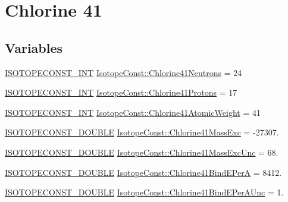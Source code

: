 \hypertarget{group___isotope_const-_chlorine-_cl41}{}\section{Chlorine 41}
\label{group___isotope_const-_chlorine-_cl41}
\subsection*{Variables}
\begin{DoxyCompactItemize}
\item 
\mbox{\hyperlink{group___isotope_const-_macros_ga5f18360b3e99483a35c32d789e62621c}{I\+S\+O\+T\+O\+P\+E\+C\+O\+N\+S\+T\+\_\+\+I\+NT}} \mbox{\hyperlink{group___isotope_const-_chlorine-_cl41_ga86fe7f65ce8d27b42a7aa416a1ee713c}{Isotope\+Const\+::\+Chlorine41\+Neutrons}} = 24
\item 
\mbox{\hyperlink{group___isotope_const-_macros_ga5f18360b3e99483a35c32d789e62621c}{I\+S\+O\+T\+O\+P\+E\+C\+O\+N\+S\+T\+\_\+\+I\+NT}} \mbox{\hyperlink{group___isotope_const-_chlorine-_cl41_ga52c18c4fc63b2d8b0b0d19fc27fe2243}{Isotope\+Const\+::\+Chlorine41\+Protons}} = 17
\item 
\mbox{\hyperlink{group___isotope_const-_macros_ga5f18360b3e99483a35c32d789e62621c}{I\+S\+O\+T\+O\+P\+E\+C\+O\+N\+S\+T\+\_\+\+I\+NT}} \mbox{\hyperlink{group___isotope_const-_chlorine-_cl41_gaf37e83dba25272ad4561d57f7f62c25d}{Isotope\+Const\+::\+Chlorine41\+Atomic\+Weight}} = 41
\item 
\mbox{\hyperlink{group___isotope_const-_macros_ga8f45a7272ce02c0b4c65c44636ed719a}{I\+S\+O\+T\+O\+P\+E\+C\+O\+N\+S\+T\+\_\+\+D\+O\+U\+B\+LE}} \mbox{\hyperlink{group___isotope_const-_chlorine-_cl41_gaf1b0f44c4e4e93cafa1da3a05fecdd3c}{Isotope\+Const\+::\+Chlorine41\+Mass\+Exc}} = -\/27307.
\item 
\mbox{\hyperlink{group___isotope_const-_macros_ga8f45a7272ce02c0b4c65c44636ed719a}{I\+S\+O\+T\+O\+P\+E\+C\+O\+N\+S\+T\+\_\+\+D\+O\+U\+B\+LE}} \mbox{\hyperlink{group___isotope_const-_chlorine-_cl41_ga3bc7e5528b9ab165e38c33a126a15d0a}{Isotope\+Const\+::\+Chlorine41\+Mass\+Exc\+Unc}} = 68.
\item 
\mbox{\hyperlink{group___isotope_const-_macros_ga8f45a7272ce02c0b4c65c44636ed719a}{I\+S\+O\+T\+O\+P\+E\+C\+O\+N\+S\+T\+\_\+\+D\+O\+U\+B\+LE}} \mbox{\hyperlink{group___isotope_const-_chlorine-_cl41_gac3b5f5261ababa43e0993b517e8b79b9}{Isotope\+Const\+::\+Chlorine41\+Bind\+E\+PerA}} = 8412.
\item 
\mbox{\hyperlink{group___isotope_const-_macros_ga8f45a7272ce02c0b4c65c44636ed719a}{I\+S\+O\+T\+O\+P\+E\+C\+O\+N\+S\+T\+\_\+\+D\+O\+U\+B\+LE}} \mbox{\hyperlink{group___isotope_const-_chlorine-_cl41_ga0fd71a2abc292ff50d2fe664790d9407}{Isotope\+Const\+::\+Chlorine41\+Bind\+E\+Per\+A\+Unc}} = 1.

\end{DoxyCompactItemize}

